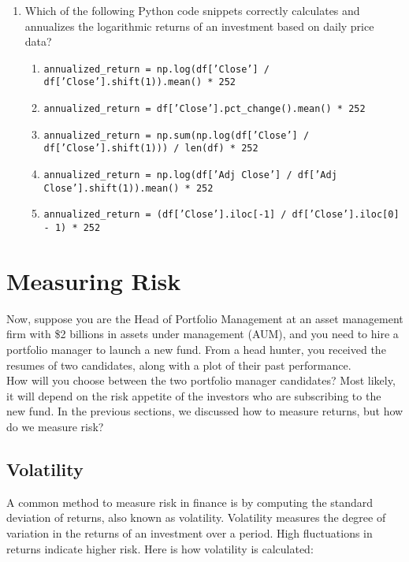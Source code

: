 \documentclass{article}
\begin{document}
\begin{enumerate}
    \item Which of the following Python code snippets correctly calculates and annualizes the logarithmic returns of an investment based on daily price data?
    \begin{enumerate}
        \item \texttt{annualized\_return = np.log(df['Close'] / df['Close'].shift(1)).mean() * 252}
        \item \texttt{annualized\_return = df['Close'].pct\_change().mean() * 252}
        \item \texttt{annualized\_return = np.sum(np.log(df['Close'] / df['Close'].shift(1))) / len(df) * 252}
        \item \texttt{annualized\_return = np.log(df['Adj Close'] / df['Adj Close'].shift(1)).mean() * 252}
        \item \texttt{annualized\_return = (df['Close'].iloc[-1] / df['Close'].iloc[0] - 1) * 252}
    \end{enumerate}
\end{enumerate}

\clearpage

\section{Measuring Risk}

Now, suppose you are the Head of Portfolio Management at an asset management firm with \$2 billions in assets under management (AUM), and you need to hire a portfolio manager to launch a new fund. From a head hunter, you received the resumes of two candidates, along with a plot of their past performance. \\

How will you choose between the two portfolio manager candidates? Most likely, it will depend on the risk appetite of the investors who are subscribing to the new fund. In the previous sections, we discussed how to measure returns, but how do we measure risk?

\subsection{Volatility}

A common method to measure risk in finance is by computing the standard deviation of returns, also known as volatility. Volatility measures the degree of variation in the returns of an investment over a period. High fluctuations in returns indicate higher risk. Here is how volatility is calculated:
\end{document}
